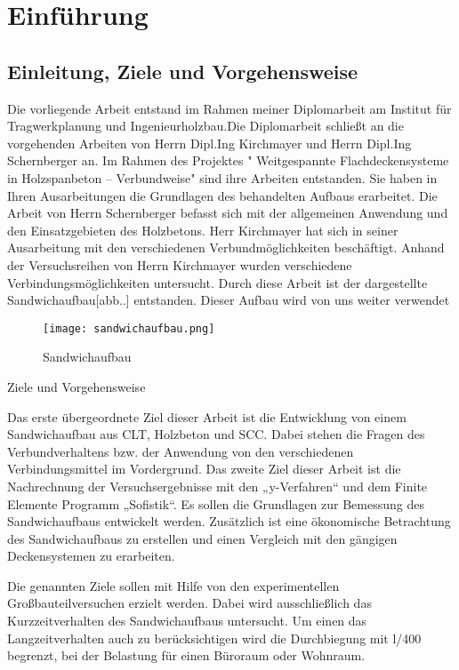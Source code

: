 \documentclass[12 pt,a4 paper ]{scrreprt}
\begin{document}
\tableofcontents
\chapter{Einführung}
\section{Einleitung, Ziele und Vorgehensweise}
 

Die vorliegende Arbeit entstand im Rahmen meiner Diplomarbeit am Institut für Tragwerkplanung und Ingenieurholzbau.Die Diplomarbeit schließt an die vorgehenden Arbeiten von Herrn Dipl.Ing Kirchmayer und Herrn Dipl.Ing Schernberger an. Im Rahmen des Projektes " Weitgespannte Flachdeckensysteme in Holzspanbeton – Verbundweise" sind ihre Arbeiten entstanden. Sie haben in Ihren Ausarbeitungen die Grundlagen des behandelten Aufbaus erarbeitet. Die Arbeit von Herrn Schernberger befasst sich mit der allgemeinen Anwendung und den Einsatzgebieten des Holzbetons. Herr Kirchmayer hat sich in seiner Ausarbeitung mit den verschiedenen Verbundmöglichkeiten beschäftigt. Anhand der Versuchsreihen von Herrn Kirchmayer wurden verschiedene Verbindungsmöglichkeiten untersucht. Durch diese Arbeit ist der dargestellte Sandwichaufbau[abb..] entstanden. Dieser Aufbau wird von uns weiter verwendet


\begin{figure}[h]
\begin{center}
\texttt{[image: sandwichaufbau.png]}
\caption{Sandwichaufbau}
\end{center}
\end{figure}

Ziele und Vorgehensweise

Das erste übergeordnete Ziel dieser Arbeit ist die Entwicklung von einem Sandwichaufbau aus CLT, Holzbeton und SCC. Dabei stehen die Fragen des Verbundverhaltens bzw. der Anwendung von den verschiedenen Verbindungsmittel im Vordergrund. Das zweite Ziel dieser Arbeit ist die Nachrechnung der Versuchsergebnisse mit den „y-Verfahren“ und dem Finite Elemente Programm „Sofistik“. Es sollen die Grundlagen zur Bemessung des Sandwichaufbaus entwickelt werden. 
Zusätzlich ist eine ökonomische Betrachtung des Sandwichaufbaus zu erstellen und einen Vergleich mit den gängigen Deckensystemen zu erarbeiten.


Die genannten Ziele sollen mit Hilfe von den experimentellen Großbauteilversuchen erzielt werden. Dabei wird ausschließlich das Kurzzeitverhalten des Sandwichaufbaus untersucht. Um einen das Langzeitverhalten auch zu berücksichtigen wird die Durchbiegung mit l/400 begrenzt, bei der Belastung für einen Büroraum oder Wohnraum.
\end{document}

